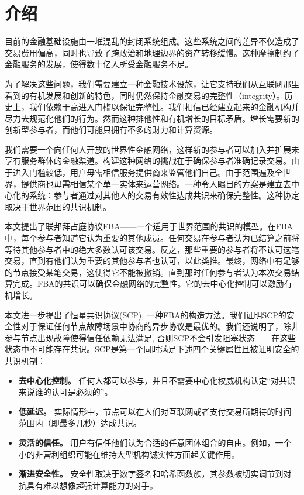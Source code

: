 \section{介绍}

目前的金融基础设施由一堆混乱的封闭系统组成。这些系统之间的差异不仅造成了交易费用偏高，同时也导致了跨政治和地理边界的资产转移缓慢。这种摩擦制约了金融服务的发展，使得数十亿人所受金融服务不足。

为了解决这些问题，我们需要建立一种金融技术设施，让它支持我们从互联网那里看到的有机发展和创新的特色，同时仍然保持金融交易的完整性（integrity）。历史上，我们依赖于高进入门槛以保证完整性。我们相信已经建立起来的金融机构并尽力去规范化他们的行为。然而这种排他性和有机增长的目标矛盾。增长需要新的创新型参与者，而他们可能只拥有不多的财力和计算资源。

我们需要一个向任何人开放的世界性金融网络，这样新的参与者可以加入并扩展未享有服务群体的金融渠道。构建这种网络的挑战在于确保参与者准确记录交易。由于进入门槛较低，用户毋需相信服务提供商来监管他们自己。由于范围遍及全世界，提供商也毋需相信某个单一实体来运营网络。一种令人瞩目的方案是建立去中心化的系统：参与者通过对其他人的交易有效性达成共识来确保完整性。这种协定取决于世界范围的共识机制。

本文提出了联邦拜占庭协议FBA——一个适用于世界范围的共识的模型。在FBA中，每个参与者知道它认为重要的其他成员。任何交易在参与者认为已结算之前将等待其他参与者中的绝大多数认可该交易。反之，那些重要的参与者将不认可这笔交易，直到有他们认为重要的其他参与者也认可，以此类推。最终，网络中有足够的节点接受某笔交易，这使得它不能被撤销。直到那时任何参与者认为本次交易结算完成。FBA的共识可以确保金融网络的完整性。它的去中心化控制可以激励有机增长。

本文进一步提出了恒星共识协议(SCP), 一种FBA的构造方法。我们证明SCP的安全性对于保证任何节点故障场景中协商的异步协议是最优的。我们还说明了，除非参与节点出现故障使得信任依赖无法满足, 否则SCP不会引发阻塞状态——在这些状态中不可能存在共识。SCP是第一个同时满足下述四个关键属性且被证明安全的共识机制：

\begin{itemize}
	\item \textbf{去中心化控制。} 任何人都可以参与，并且不需要中心化权威机构认定``对共识来说谁的认可是必须的''。
	\item \textbf{低延迟。} 实际情形中，节点可以在人们对互联网或者支付交易所期待的时间范围内（即最多几秒）达成共识。
	\item \textbf{灵活的信任。} 用户有信任他们认为合适的任意团体组合的自由。例如，一个小的非营利组织可能在维持大型机构诚实性方面起关键作用。
	\item \textbf{渐进安全性。} 安全性取决于数字签名和哈希函数族，其参数被切实调节到对抗具有难以想像超强计算能力的对手。
\end{itemize}

